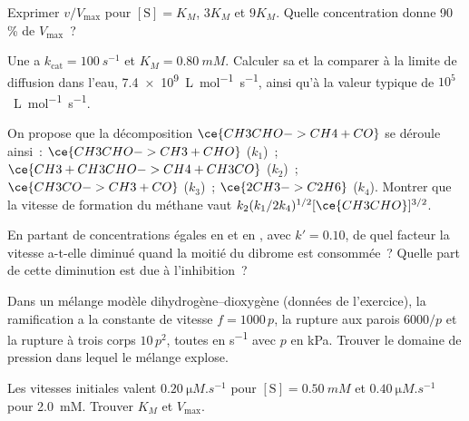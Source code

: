 \begin{exercise}[$\star$]\label{exo:b3:complex-kinetics:3}
Exprimer $v/V_{\max}$ pour $[\mathrm S] = K_M$, $3K_M$ et $9K_M$. Quelle
concentration donne 90\,\% de
$V_{\max}$~?
\end{exercise}

\begin{exercise}[$\star$]\label{exo:b3:complex-kinetics:4}
Une  a $k_{\mathrm{cat}} = \qty{100}{s^{-1}}$ et $K_M = \qty{0.80}{mM}$.
Calculer sa  et la comparer à la limite de
diffusion dans l'eau, \qty{7.4e9}{L.mol^{-1}.s^{-1}},
ainsi qu'à la valeur typique de $10^5$~\unit{L.mol^{-1}.s^{-1}}.
\end{exercise}

\begin{exercise}[$\star\star$]\label{exo:b3:complex-kinetics:5}
On propose que la décomposition $\ce{CH3CHO -> CH4 + CO}$ se déroule
ainsi~: $\ce{CH3CHO -> CH3 +
CHO}$ ($k_1$)~; $\ce{CH3 + CH3CHO -> CH4 + CH3CO}$ ($k_2$)~; $\ce{CH3CO -> CH3 + CO}$ ($k_3$)~;
$\ce{2 CH3 -> C2H6}$ ($k_4$). Montrer que la vitesse de formation du
méthane vaut
$k_2(k_1/2k_4)^{1/2}[\ce{CH3CHO}]^{3/2}$.
\end{exercise}

\begin{exercise}[$\star\star$]\label{exo:b3:complex-kinetics:6}
En partant de concentrations égales en  et en , avec
$k' = 0.10$, de quel facteur la vitesse a-t-elle diminué quand la
moitié du dibrome est consommée~? Quelle part de cette diminution est
due à l'inhibition~?
\end{exercise}

\begin{exercise}[$\star\star$]\label{exo:b3:complex-kinetics:7}
Dans un mélange modèle dihydrogène--dioxygène (données de l'exercice),
la ramification a la constante de vitesse $f = 1000\,p$, la rupture aux
parois $6000/p$ et la rupture à trois corps
$10\,p^2$, toutes en \unit{s^{-1}} avec $p$ en kPa. Trouver le domaine de
pression dans lequel le mélange explose.
\end{exercise}

\begin{exercise}[$\star\star$]\label{exo:b3:complex-kinetics:8}
Les vitesses initiales valent $\qty{0.20}{\micro M.s^{-1}}$ pour $[\mathrm S] = \qty{0.50}{mM}$ et $\qty{0.40}{\micro M.s^{-1}}$ pour
\qty{2.0}{mM}. Trouver $K_M$ et $V_{\max}$.
\end{exercise}

